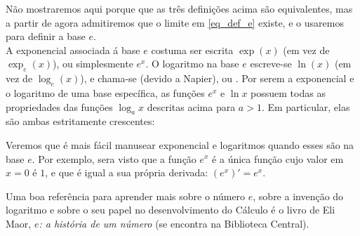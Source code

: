 Não mostraremos aqui porque que as três definições acima são equivalentes, mas a partir
de agora admitiremos que o limite em \eqref{eq_def_e} existe, e o usaremos para definir a
base $e$.\\

A exponencial associada á base $e$ costuma ser escrita $\exp(x)$ (em vez de 
$\exp_e(x)$), ou simplesmente $e^x$. O logaritmo na base $e$ escreve-se $\ln(x)$
(em vez de $\log_e(x)$), e chama-se  (devido a Napier), ou .
Por serem a exponencial e o logaritmo de uma base específica, as funções $e^x$ e
$\ln x$ possuem todas as propriedades das funções $\log_ax$ descritas acima para
$a>1$. Em particular, elas são ambas estritamente crescentes:

\begin{center}
\begin{bmlimage}\end{bmlimage}
\end{center}

Veremos que é mais fácil manusear 
exponencial e logaritmos quando esses são na base $e$. Por exemplo, sera
visto que a função $e^x$ é a única função cujo valor em $x=0$ é $1$, e que é
igual a sua própria derivada: $(e^x)'=e^x$.

\begin{obs}
Uma boa referência para aprender mais sobre o número $e$, sobre a invenção do
logaritmo e sobre o seu papel no desenvolvimento do Cálculo é o livro de Eli
Maor, \emph{$e$: a história de um número} (se encontra na Biblioteca Central).
\end{obs}

